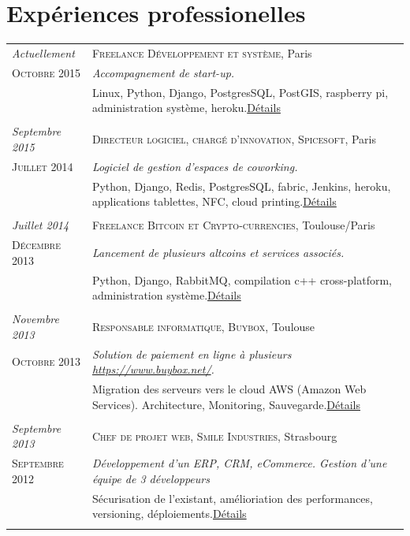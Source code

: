 \documentclass[a4paper,10pt]{article}
\begin{document}
\section{Expériences professionelles}
\begin{tabular}{p{}|p{}}	

	\emph{Actuellement} & \textsc{Freelance Développement et système}, Paris \\\textsc{Octobre 2015}&\emph{Accompagnement de start-up.}\\&\footnotesize{Linux, Python, Django, PostgresSQL, PostGIS, raspberry pi, administration système, heroku.\hyperlink{freelance}{\hfill \footnotesize Détails}}\\\multicolumn{2}{c}{} \\
	
	\emph{Septembre 2015} & \textsc{Directeur logiciel, chargé d'innovation, Spicesoft}, Paris \\\textsc{Juillet 2014}&\emph{Logiciel de gestion d'espaces de coworking.}\\&\footnotesize{Python, Django, Redis, PostgresSQL, fabric, Jenkins, heroku, applications tablettes, NFC, cloud printing.\hyperlink{spicesoft}{\hfill \footnotesize Détails}}\\\multicolumn{2}{c}{} \\
	
	\emph{Juillet 2014} & \textsc{Freelance Bitcoin et Crypto-currencies}, Toulouse/Paris \\\textsc{Décembre 2013}&\emph{Lancement de plusieurs altcoins et services associés.}\\&\footnotesize{Python, Django, RabbitMQ, compilation c++ cross-platform, administration système.\hyperlink{bitcoin}{\hfill \footnotesize Détails}}\\\multicolumn{2}{c}{} \\

	\emph{Novembre 2013} & \textsc{Responsable informatique, Buybox}, Toulouse \\\textsc{Octobre 2013}&\emph{Solution de paiement en ligne à plusieurs \href{https://www.buybox.net/}{https://www.buybox.net/}.}\\&\footnotesize{Migration des serveurs vers le cloud AWS (Amazon Web Services). Architecture, Monitoring, Sauvegarde.\hyperlink{buybox}{\hfill \footnotesize Détails}}\\\multicolumn{2}{c}{} \\
	\emph{Septembre 2013} & \textsc{Chef de projet web, Smile Industries}, Strasbourg \\\textsc{Septembre 2012}&\emph{Développement d'un ERP, CRM, eCommerce. Gestion d'une équipe de 3 développeurs}\\&\footnotesize{Sécurisation de l'existant, amélioriation des performances, versioning, déploiements.\hyperlink{axess}{\hfill \footnotesize Détails}}\\\multicolumn{2}{c}{} \\


\end{tabular}
\end{document}
